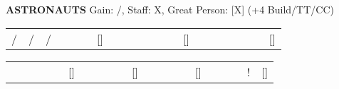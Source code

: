 \begin{flushleft}
  \textbf{ASTRONAUTS} {\color{supplemental} Gain: /, Staff: X, Great Person: [X] (+4 Build/TT/CC)}
\end{flushleft}
\begin{tabular}{|c|c|c|c|c|c|c|c|c|c|c|c|c|c|c|c|c|c|c|c|c}
\cline{1-6} \cline{8-13} \cline{15-20}
/ &
/ & /
&
&
&
& {[}{]}
&
&
&
&
&
&
& {[}{]}
&
&
&
&
&
&
& {[}{]} \\ \cline{1-6} \cline{8-13} \cline{15-20}
\end{tabular}
\newline\newline
\begin{tabular}{|c|c|c|c|c|c|c|c|c|c|c|c|c|c|c|c|c|c|c|c|c}
\cline{1-5} \cline{7-10} \cline{12-15} \cline{17-20}
 &
 &
 &
 &
 & {[}{]}
 &
 &
 &
 &
 & {[}{]}
 &
 &
 &
 &
 & {[}{]}
 &
 &
 &
 & !
 & {[}{]} \\ \cline{1-5} \cline{7-10} \cline{12-15} \cline{17-20}
\end{tabular}
